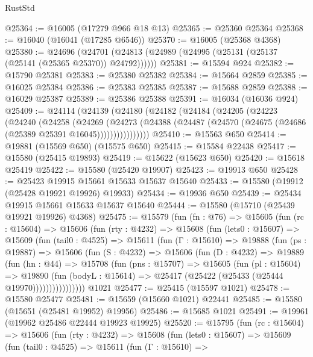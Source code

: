 \begin{lexlean}{RustStd}
\begin{coremodule}
@25364 := @16005 (@17279 @966 @18 @13)
@25365 := @25360 @25364
@25368 := @16040 (@16041 (@17285 @6546))
@25370 := @16005 (@25368 @4368)
@25380 := @24696
    (@24701 (@24813 (@24989 (@24995 (@25131 (@25137 (@25141 (@25365 @25370)) @24792))))))
@25381 := @15594 @924
@25382 := @15790 @25381
@25383 := @25380 @25382
@25384 := @15664 @2859
@25385 := @16025 @25384
@25386 := @25383 @25385
@25387 := @15688 @2859
@25388 := @16029 @25387
@25389 := @25386 @25388
@25391 := @16034 (@16036 @924)
@25409 := @24114
    (@24139
      (@24180
        (@24182
          (@24184
            (@24205
              (@24223
                (@24240
                  (@24258
                    (@24269
                      (@24273
                        (@24388
                          (@24487 (@24570 (@24675 (@24686 (@25389 @25391 @16045))))))))))))))))
@25410 := @15563 @650
@25414 := @19881 (@15569 @650) (@15575 @650)
@25415 := @15584 @22438
@25417 := @15580 (@25415 @19893)
@25419 := @15622 (@15623 @650)
@25420 := @15618 @25419
@25422 := @15580 (@25420 @19907)
@25423 := @19913 @650
@25428 := @25423 @19915 @15661 @15633 @15637 @15640
@25433 := @15580 (@19912 (@25428 @19921 @19926) @19933)
@25434 := @19936 @650
@25439 := @25434 @19915 @15661 @15633 @15637 @15640
@25444 := @15580 (@15710 (@25439 @19921 @19926) @4368)
@25475 := @15579
    (fun (fn : @76) =>
    @15605
      (fun (rc : @15604) =>
      @15606
        (fun (rty : @4232) =>
        @15608
          (fun (lets0 : @15607) =>
          @15609
            (fun (tail0 : @4525) =>
            @15611
              (fun (Γ : @15610) =>
              @19888
                (fun (ps : @19887) =>
                @15606
                  (fun (S : @4232) =>
                  @15606
                    (fun (D : @4232) =>
                    @19889
                      (fun (hn : @44) =>
                      @15708
                        (fun (pns : @15707) =>
                        @15605
                          (fun (pl : @15604) =>
                          @19890
                            (fun (bodyL : @15614) =>
                            @25417 (@25422 (@25433 (@25444 @19970))))))))))))))))
    @1021
@25477 := @25415 (@15597 @1021)
@25478 := @15580 @25477
@25481 := @15659 (@15660 @1021) @22441
@25485 := @15580 (@15651 (@25481 @19952) @19956)
@25486 := @15685 @1021
@25491 := @19961 (@19962 @25486 @22444 @19923 @19925)
@25520 := @15795
    (fun (rc : @15604) =>
    @15606
      (fun (rty : @4232) =>
      @15608
        (fun (lets0 : @15607) =>
        @15609
          (fun (tail0 : @4525) =>
          @15611
            (fun (Γ : @15610) =>

\end{coremodule}
\end{lexlean}
